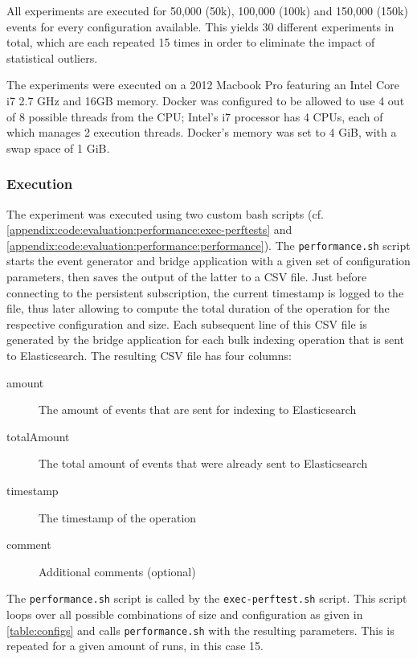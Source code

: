 All experiments are executed for 50,000 (50k), 100,000 (100k) and 150,000 (150k) events for every configuration available.
This yields 30 different experiments in total, which are each repeated 15 times in order to eliminate the impact of statistical outliers.

The experiments were executed on a 2012 Macbook Pro featuring an Intel Core i7 2.7 GHz and 16GB memory.
Docker was configured to be allowed to use 4 out of 8 possible threads from the CPU; Intel's i7 processor has 4 CPUs, each of which manages 2 execution threads.
Docker's memory was set to 4 GiB, with a swap space of 1 GiB.

\subsubsection{Execution}

The experiment was executed using two custom bash scripts (cf. \cref{appendix:code:evaluation:performance:exec-perftests} and \cref{appendix:code:evaluation:performance:performance}).
The \texttt{performance.sh} script starts the event generator and bridge application with a given set of configuration parameters, then saves the output of the latter to a CSV file.
Just before connecting to the persistent subscription, the current timestamp is logged to the file, thus later allowing to compute the total duration of the operation for the respective configuration and size.
Each subsequent line of this CSV file is generated by the bridge application for each bulk indexing operation that is sent to Elasticsearch.
The resulting CSV file has four columns:

\begin{description}
\item[amount] The amount of events that are sent for indexing to Elasticsearch
\item[totalAmount] The total amount of events that were already sent to Elasticsearch
\item[timestamp] The timestamp of the operation
\item[comment] Additional comments (optional)
\end{description}

The \texttt{performance.sh} script is called by the \texttt{exec-perftest.sh} script.
This script loops over all possible combinations of size and configuration as given in \cref{table:configs} and calls \texttt{performance.sh} with the resulting parameters.
This is repeated for a given amount of runs, in this case 15.

